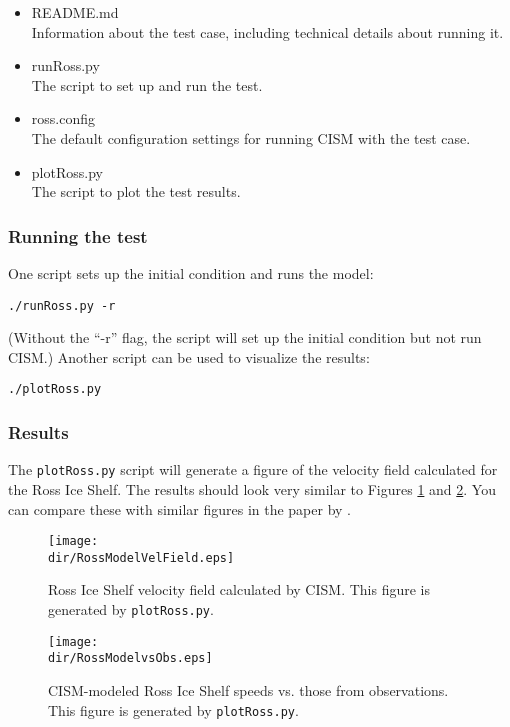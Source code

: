 \begin{itemize}
	\item README.md \\
		Information about the test case, including technical details about running it.
	\item runRoss.py \\
		The script to set up and run the test.
	\item ross.config \\
  The default configuration settings for running CISM with the test case.
	\item plotRoss.py \\
		The script to plot the test results.
\end{itemize}

\subsubsection{Running the test}
One script sets up the initial condition and runs the model:

\texttt{./runRoss.py -r}

\noindent
(Without the ``-r'' flag, the script will set up the initial condition but not run CISM.)
Another script can be used to visualize the results:

\texttt{./plotRoss.py}

\subsubsection{Results}
The \texttt{plotRoss.py} script will generate a figure of the velocity field
calculated for the Ross Ice Shelf.  The results should look very similar to Figures \ref{fig:rossresults1} and \ref{fig:rossresults2}. You can
compare these with similar figures in the paper by \citet{MacAyeal:1996vn}.

\begin{figure}[H]
	\centering
	\texttt{[image: \\dir/RossModelVelField.eps]}
	\caption{Ross Ice Shelf velocity field calculated by CISM. This figure is generated by \texttt{plotRoss.py}.}
	\label{fig:rossresults1}
\end{figure}

\begin{figure}[H]
	\centering
	\texttt{[image: \\dir/RossModelvsObs.eps]}
	\caption{CISM-modeled Ross Ice Shelf speeds vs. those from observations. This figure is generated by \texttt{plotRoss.py}.}
	\label{fig:rossresults2}
\end{figure}
\FloatBarrier


